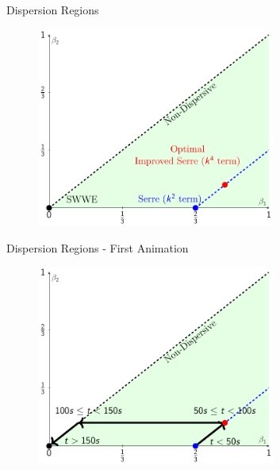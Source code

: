 \documentclass[pdf]{beamer}
\begin{document}
\begin{frame}{Dispersion Regions}
\begin{figure}
	\centering
	\includegraphics[width=0.7\textwidth]{./Pics/Tex/Explanatory/RegionsPlot/BetaPlotAll.pdf}
\end{figure}
\end{frame}

\begin{frame}{Dispersion Regions - First  Animation}
\begin{figure}
	\centering
	\includegraphics[width=0.7\textwidth]{./Pics/Tex/Explanatory/RegionsPlot/BetaPlotAllArrows.pdf}
\end{figure}
\end{frame}

\begin{frame}[plain]{}
\end{frame}
\end{document}
